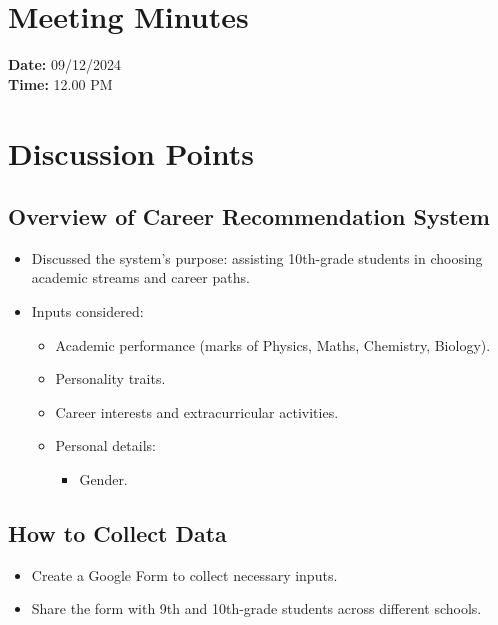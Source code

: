 \documentclass[a4paper,12pt]{article}
\begin{document}
\section*{Meeting Minutes}

\textbf{Date:} 09/12/2024 \\ 
\textbf{Time:} 12.00 PM\\

\section*{Discussion Points}

\subsection*{Overview of Career Recommendation System}
\begin{itemize}
    \item Discussed the system’s purpose: assisting 10th-grade students in choosing academic streams and career paths.
    \item Inputs considered:
    \begin{itemize}
        \item Academic performance (marks of Physics, Maths, Chemistry, Biology).
        \item Personality traits.
        \item Career interests and extracurricular activities.
        \item Personal details:
        \begin{itemize}
            \item Gender.
        \end{itemize}
    \end{itemize}
\end{itemize}

\subsection*{How to Collect Data}
\begin{itemize}
    \item Create a Google Form to collect necessary inputs.
    \item Share the form with 9th and 10th-grade students across different schools.
\end{itemize}
\end{document}
